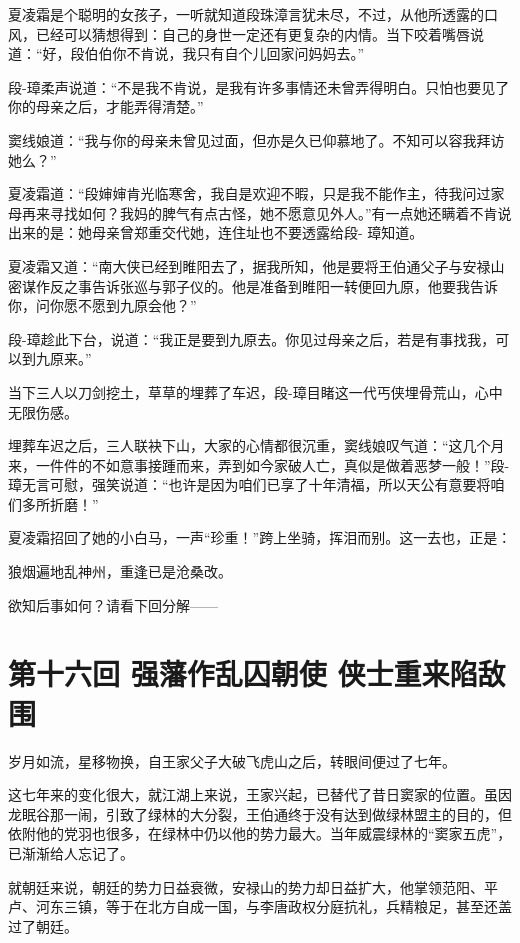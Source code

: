 \documentclass[12pt,oneside]{book}
\begin{document}
夏凌霜是个聪明的女孩子，一听就知道段珠漳言犹未尽，不过，从他所透露的口风，已经可以猜想得到：自己的身世一定还有更复杂的内情。当下咬着嘴唇说道：``好，段伯伯你不肯说，我只有自个儿回家问妈妈去。''

段-璋柔声说道：``不是我不肯说，是我有许多事情还未曾弄得明白。只怕也要见了你的母亲之后，才能弄得清楚。''

窦线娘道：``我与你的母亲未曾见过面，但亦是久已仰慕地了。不知可以容我拜访她么？''

夏凌霜道：``段婶婶肯光临寒舍，我自是欢迎不暇，只是我不能作主，待我问过家母再来寻找如何？我妈的脾气有点古怪，她不愿意见外人。''有一点她还瞒着不肯说出来的是：她母亲曾郑重交代她，连住址也不要透露给段-
璋知道。

夏凌霜又道：``南大侠已经到睢阳去了，据我所知，他是要将王伯通父子与安禄山密谋作反之事告诉张巡与郭子仪的。他是准备到睢阳一转便回九原，他要我告诉你，问你愿不愿到九原会他？''

段-璋趁此下台，说道：``我正是要到九原去。你见过母亲之后，若是有事找我，可以到九原来。''

当下三人以刀剑挖土，草草的埋葬了车迟，段-璋目睹这一代丐侠埋骨荒山，心中无限伤感。

埋葬车迟之后，三人联袂下山，大家的心情都很沉重，窦线娘叹气道：``这几个月来，一件件的不如意事接踵而来，弄到如今家破人亡，真似是做着恶梦一般！''段-璋无言可慰，强笑说道：``也许是因为咱们已享了十年清福，所以天公有意要将咱们多所折磨！''

夏凌霜招回了她的小白马，一声``珍重！''跨上坐骑，挥泪而别。这一去也，正是：

狼烟遍地乱神州，重逢已是沧桑改。

欲知后事如何？请看下回分解------

\chapter{第十六回 强藩作乱囚朝使
侠士重来陷敌围}\label{ux7b2cux5341ux516dux56de-ux5f3aux85e9ux4f5cux4e71ux56daux671dux4f7f-ux4fa0ux58ebux91cdux6765ux9677ux654cux56f4}

岁月如流，星移物换，自王家父子大破飞虎山之后，转眼间便过了七年。

这七年来的变化很大，就江湖上来说，王家兴起，已替代了昔日窦家的位置。虽因龙眠谷那一闹，引致了绿林的大分裂，王伯通终于没有达到做绿林盟主的目的，但依附他的党羽也很多，在绿林中仍以他的势力最大。当年威震绿林的``窦家五虎''，已渐渐给人忘记了。

就朝廷来说，朝廷的势力日益衰微，安禄山的势力却日益扩大，他掌领范阳、平卢、河东三镇，等于在北方自成一国，与李唐政权分庭抗礼，兵精粮足，甚至还盖过了朝廷。
\end{document}
